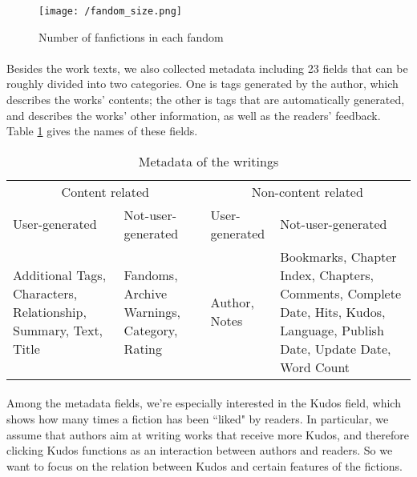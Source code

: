 \documentclass[11pt]{article} %
\begin{document}
\begin{figure}[htbp]
\begin{center}
\texttt{[image: /fandom\_size.png]}
\caption{Number of fanfictions in each fandom}
\label{fig:fandom_size}
\end{center}
\end{figure}


\paragraph{} Besides the work texts, we also collected metadata including 23 fields that can be roughly divided into two categories. One is tags generated by the author, which describes the works' contents; the other is tags that are automatically generated, and describes the works’ other information, as well as the readers' feedback. Table \ref{tab:metadata} gives the names of these fields. 

\begin{table}[htp]
\caption{Metadata of the writings}
\begin{center}
\begin{tabular}{p{3cm}|p{3cm}|p{3cm}|p{3cm}}
  \hline			
 \multicolumn{2}{c}{ Content related} & \multicolumn{2}{c}{Non-content related}\\ 
 User-generated & Not-user-generated &  User-generated & Not-user-generated \\
\hline
Additional Tags, Characters, Relationship, Summary, Text, Title
 & Fandoms,  Archive Warnings, Category, Rating
& Author, Notes
& Bookmarks, Chapter Index, Chapters, Comments, Complete Date, Hits, Kudos, Language, Publish Date, Update Date, Word Count\\
\hline
\end{tabular}
\end{center}
\label{tab:metadata}
\end{table}%

\paragraph{} Among the metadata fields, we're especially interested in the Kudos field, which shows how many times a fiction has been ``liked" by readers. In particular, we assume that authors aim at writing works that receive more Kudos, and therefore clicking Kudos functions as an interaction between authors and readers. So we want to focus on the relation between Kudos and certain features of the fictions.
\end{document}
